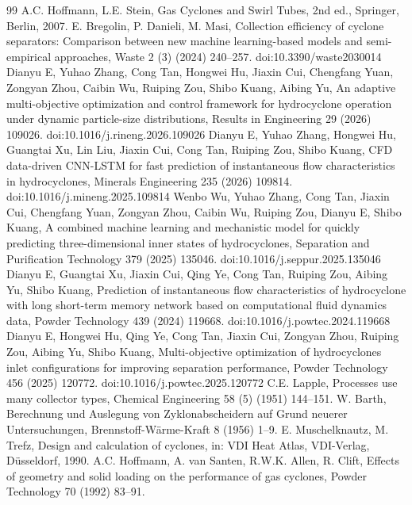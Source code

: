 \documentclass[12pt]{article}
\begin{document}
\clearpage
\begin{thebibliography}{99}\small
{}A.C. Hoffmann, L.E. Stein, Gas Cyclones and Swirl Tubes, 2nd ed., Springer, Berlin, 2007.
E. Bregolin, P. Danieli, M. Masi, Collection efficiency of cyclone separators: Comparison between new machine learning-based models and semi-empirical approaches, Waste 2 (3) (2024) 240--257. doi:10.3390/waste2030014
Dianyu E, Yuhao Zhang, Cong Tan, Hongwei Hu, Jiaxin Cui, Chengfang Yuan, Zongyan Zhou, Caibin Wu, Ruiping Zou, Shibo Kuang, Aibing Yu, An adaptive multi-objective optimization and control framework for hydrocyclone operation under dynamic particle-size distributions, Results in Engineering 29 (2026) 109026. doi:10.1016/j.rineng.2026.109026
Dianyu E, Yuhao Zhang, Hongwei Hu, Guangtai Xu, Lin Liu, Jiaxin Cui, Cong Tan, Ruiping Zou, Shibo Kuang, CFD data-driven CNN-LSTM for fast prediction of instantaneous flow characteristics in hydrocyclones, Minerals Engineering 235 (2026) 109814. doi:10.1016/j.mineng.2025.109814
Wenbo Wu, Yuhao Zhang, Cong Tan, Jiaxin Cui, Chengfang Yuan, Zongyan Zhou, Caibin Wu, Ruiping Zou, Dianyu E, Shibo Kuang, A combined machine learning and mechanistic model for quickly predicting three-dimensional inner states of hydrocyclones, Separation and Purification Technology 379 (2025) 135046. doi:10.1016/j.seppur.2025.135046
Dianyu E, Guangtai Xu, Jiaxin Cui, Qing Ye, Cong Tan, Ruiping Zou, Aibing Yu, Shibo Kuang, Prediction of instantaneous flow characteristics of hydrocyclone with long short-term memory network based on computational fluid dynamics data, Powder Technology 439 (2024) 119668. doi:10.1016/j.powtec.2024.119668
Dianyu E, Hongwei Hu, Qing Ye, Cong Tan, Jiaxin Cui, Zongyan Zhou, Ruiping Zou, Aibing Yu, Shibo Kuang, Multi-objective optimization of hydrocyclones inlet configurations for improving separation performance, Powder Technology 456 (2025) 120772. doi:10.1016/j.powtec.2025.120772
C.E. Lapple, Processes use many collector types, Chemical Engineering 58 (5) (1951) 144--151.
W. Barth, Berechnung und Auslegung von Zyklonabscheidern auf Grund neuerer Untersuchungen, Brennstoff-W\"arme-Kraft 8 (1956) 1--9.
E. Muschelknautz, M. Trefz, Design and calculation of cyclones, in: VDI Heat Atlas, VDI-Verlag, D\"usseldorf, 1990.
A.C. Hoffmann, A. van Santen, R.W.K. Allen, R. Clift, Effects of geometry and solid loading on the performance of gas cyclones, Powder Technology 70 (1992) 83--91.

\end{thebibliography}
\end{document}
